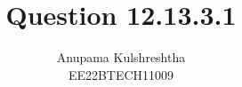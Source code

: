 \documentclass[]{article}
\title{Question 12.13.3.1}
\author{Anupama Kulshreshtha \\ EE22BTECH11009}
\date{}
\begin{document}
\maketitle
\providecommand{\pr}[1]{\ensuremath{\Pr\left(#1\right)}}
\providecommand{\prt}[2]{\ensuremath{p_{#1}^{\left(#2\right)} }}        %
\providecommand{\qfunc}[1]{\ensuremath{Q\left(#1\right)}}
\providecommand{\sbrak}[1]{\ensuremath{{}\left[#1\right]}}
\providecommand{\lsbrak}[1]{\ensuremath{{}\left[#1\right.}}
\providecommand{\rsbrak}[1]{\ensuremath{{}\left.#1\right]}}
\providecommand{\brak}[1]{\ensuremath{\left(#1\right)}}
\providecommand{\lbrak}[1]{\ensuremath{\left(#1\right.}}
\providecommand{\rbrak}[1]{\ensuremath{\left.#1\right)}}
\providecommand{\cbrak}[1]{\ensuremath{\left\{#1\right\}}}
\providecommand{\lcbrak}[1]{\ensuremath{\left\{#1\right.}}
\providecommand{\rcbrak}[1]{\ensuremath{\left.#1\right\}}}
\newcommand{\sgn}{\mathop{\mathrm{sgn}}}
\providecommand{\abs}[1]{\left\vert#1\right\vert}
\providecommand{\res}[1]{\Res\displaylimits_{#1}} 
\providecommand{\norm}[1]{\left\lVert#1\right\rVert}
\providecommand{\mtx}[1]{\mathbf{#1}}
\providecommand{\mean}[1]{E\left[ #1 \right]}
\providecommand{\cond}[2]{#1\middle|#2}
\providecommand{\fourier}{\overset{\mathcal{F}}{ \rightleftharpoons}}
\newenvironment{amatrix}[1]{%
  \left(\begin{array}{@{}*{#1}{c}|c@{}}
}{%
  \end{array}\right)
}
\newcommand{\solution}{\noindent \textbf{Solution: }}
\newcommand{\cosec}{\,\text{cosec}\,}
\providecommand{\dec}[2]{\ensuremath{\overset{#1}{\underset{#2}{\gtrless}}}}
\newcommand{\myvec}[1]{\ensuremath{\begin{pmatrix}#1\end{pmatrix}}}
\newcommand{\mydet}[1]{\ensuremath{\begin{vmatrix}#1\end{vmatrix}}}
\newcommand{\myaugvec}[2]{\ensuremath{\begin{amatrix}{#1}#2\end{amatrix}}}
\providecommand{\rank}{\text{rank}}
\providecommand{\pr}[1]{\ensuremath{\Pr\left(#1\right)}}
\providecommand{\qfunc}[1]{\ensuremath{Q\left(#1\right)}}
	\newcommand*{\permcomb}[4][0mu]{{{}^{#3}\mkern#1#2_{#4}}}
\newcommand*{\perm}[1][-3mu]{\permcomb[#1]{P}}
\newcommand*{\comb}[1][-1mu]{\permcomb[#1]{C}}
\end{document}
